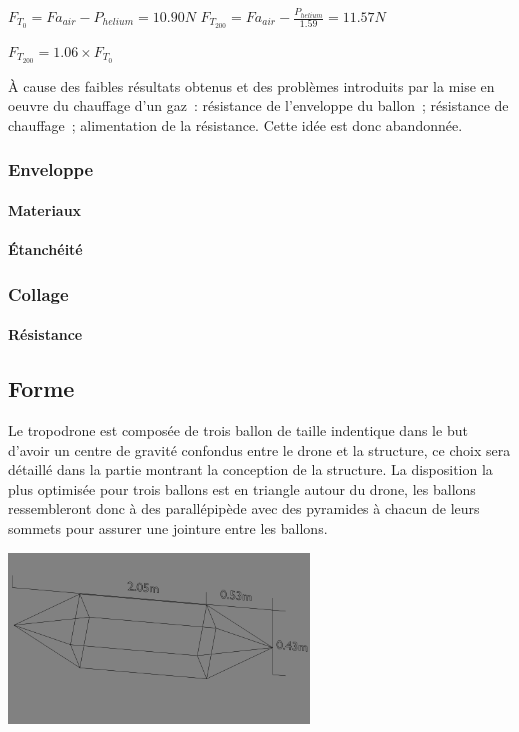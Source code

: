 \documentclass[a4paper,11pt]{article}
\begin{document}
\begin{center}
  $\displaystyle{F_{T_0} = Fa_{air} - P_{helium} = 10.90 N}$
  \bigbreak
  $\displaystyle{F_{T_{200}} = Fa_{air} - \frac{P_{helium}}{1.59} = 11.57 N}$ \\
\end{center}

$F_{T_{200}} = 1.06 \times F_{T_0}$

À cause des faibles résultats obtenus et des problèmes introduits par la mise en oeuvre du chauffage d'un gaz~: résistance de l'enveloppe du ballon~; résistance de chauffage~; alimentation de la résistance. Cette idée est donc abandonnée.

\subsubsection{Enveloppe}

\paragraph{Materiaux}

\paragraph{Étanchéité}

\subsubsection{Collage}

\paragraph{Résistance}

\subsection{Forme}

Le tropodrone est composée de trois ballon de taille indentique dans le but d'avoir un centre de gravité confondus entre le drone et la structure, ce choix sera détaillé dans la partie montrant la conception de la structure.
La disposition la plus optimisée pour trois ballons est en triangle autour du drone, les ballons ressembleront donc à des parallépipède avec des pyramides à chacun de leurs sommets pour assurer une jointure entre les ballons.

\begin{center}
 \includegraphics[width=8cm]{../Images/ballon.png}
\end{center}
\end{document}
